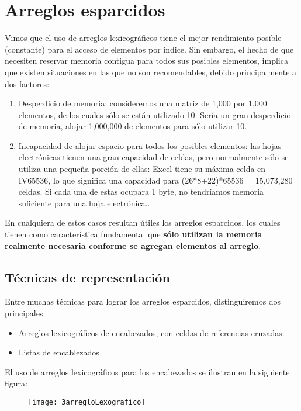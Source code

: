 \section{Arreglos esparcidos}
Vimos que el uso de arreglos lexicográficos tiene el mejor rendimiento
posible (constante) para el acceso de elementos por índice.  Sin
embargo, el hecho de que necesiten reservar memoria contigua para
todos sus posibles elementos, implica que existen situaciones en las
que no son recomendables, debido principalmente a dos factores:

\begin{enumerate}
\item Desperdicio de memoria: consideremos una matriz de 1,000 por 1,000
elementos, de los cuales sólo se están utilizado 10. Sería un gran
desperdicio de memoria, alojar 1,000,000 de elementos para sólo
utilizar 10.
\item Incapacidad de alojar espacio para todos los posibles elementos: las
hojas electrónicas tienen una gran capacidad de celdas, pero
normalmente sólo se utiliza una pequeña porción de ellas: Excel tiene
su máxima celda en IV65536, lo que significa una capacidad para
(26*8+22)*65536 = 15,073,280 celdas.  Si cada una de estas ocupara 1
byte, no tendríamos memoria suficiente para una hoja electrónica..
\end{enumerate}


En cualquiera de estos casos resultan útiles los arreglos esparcidos,
los cuales tienen como característica fundamental que \textbf{sólo utilizan la
memoria realmente necesaria conforme se agregan elementos al arreglo}.

\subsection{Técnicas de representación}

Entre muchas técnicas para lograr los arreglos esparcidos,
distinguiremos dos principales:
\begin{itemize}
\item Arreglos lexicográficos de encabezados, con celdas de referencias cruzadas.
\item Listas de encablezados
\end{itemize}

El uso de arreglos lexicográficos para los encabezados se ilustran en
la siguiente figura:
\begin{figure}[H]
  \centering
  \texttt{[image: 3arregloLexografico]}
\end{figure}

